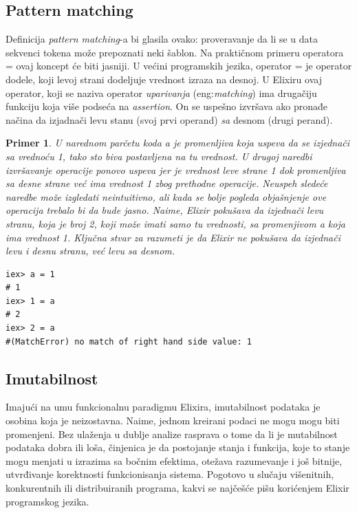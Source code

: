 \documentclass[a4paper]{article}
\newtheorem{primer}{Primer}[section]
\begin{document}
\subsection{Pattern matching}
\label{sec:pattern}
Definicija \textit{pattern matching}-a bi glasila ovako: proveravanje da li se u data sekvenci tokena može prepoznati neki šablon. Na praktičnom primeru operatora = ovaj koncept će biti jasniji. 
U većini programskih jezika, operator = je operator dodele, koji levoj strani dodeljuje vrednost izraza na desnoj. U Elixiru ovaj operator, koji se naziva operator \textit{uparivanja} (eng:\textit{matching}) ima drugačiju funkciju koja više podseća na \textit{assertion}. On se uspešno izvršava ako pronađe načina da izjadnači levu stanu (svoj prvi operand) \textit{sa} desnom (drugi perand).
\begin{primer}
U narednom parčetu koda \textit{a} je promenljiva koja uspeva da se izjednači sa vrednoću 1, tako sto biva postavljena na tu vrednost. U drugoj naredbi izvršavanje operacije ponovo uspeva jer je vrednost leve strane 1 dok promenljiva sa desne strane već ima vrednost 1 zbog prethodne operacije. Neuspeh sledeće naredbe može izgledati neintuitivno, ali kada se bolje pogleda objašnjenje ove operacija trebalo bi da bude jasno. Naime, Elixir pokušava da izjednači levu stranu, koja je broj 2, koji može imati samo tu vrednosti, sa promenjivom \textit{a} koja ima vrednost 1. Ključna stvar za razumeti je da Elixir ne pokušava da izjednači levu \textit{i} desnu stranu, već levu \textit{sa} desnom.
\end{primer}
\begin{lstlisting}[caption={Primer jednostavnog pattern matchinga},frame=single, label=simple]
iex> a = 1
# 1
iex> 1 = a
# 2
iex> 2 = a
#(MatchError) no match of right hand side value: 1
\end{lstlisting}
\subsection{Imutabilnost}
\label{sec:tipovi}
Imajući na umu funkcionalnu paradigmu Elixira, imutabilnost podataka je osobina koja je neizostavna. Naime, jednom kreirani podaci ne mogu mogu biti promenjeni. Bez ulaženja u dublje analize rasprava o tome da li je mutabilnost podataka dobra ili loša, činjenica je da postojanje stanja i funkcija, koje to stanje mogu menjati u izrazima sa bočnim efektima, otežava razumevanje i još bitnije, utvrđivanje korektnosti funkcionisanja sistema. Pogotovo u slučaju višenitnih, konkurentnih ili distribuiranih programa, kakvi se najčešće pišu korićenjem Elixir programskog jezika. 
\end{document}
